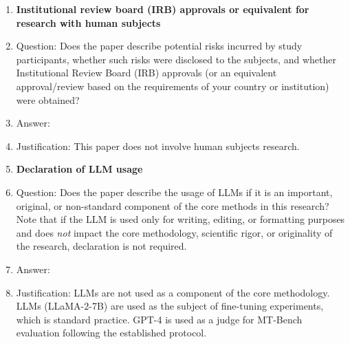 \begin{enumerate}
\item {\bf Institutional review board (IRB) approvals or equivalent for research with human subjects}
    \item[] Question: Does the paper describe potential risks incurred by study participants, whether such risks were disclosed to the subjects, and whether Institutional Review Board (IRB) approvals (or an equivalent approval/review based on the requirements of your country or institution) were obtained?
    \item[] Answer: \answerNA{}
    \item[] Justification: This paper does not involve human subjects research.

\item {\bf Declaration of LLM usage}
    \item[] Question: Does the paper describe the usage of LLMs if it is an important, original, or non-standard component of the core methods in this research? Note that if the LLM is used only for writing, editing, or formatting purposes and does \emph{not} impact the core methodology, scientific rigor, or originality of the research, declaration is not required.
    \item[] Answer: \answerNA{}
    \item[] Justification: LLMs are not used as a component of the core methodology. LLMs (LLaMA-2-7B) are used as the subject of fine-tuning experiments, which is standard practice. GPT-4 is used as a judge for MT-Bench evaluation following the established protocol.

\end{enumerate}
